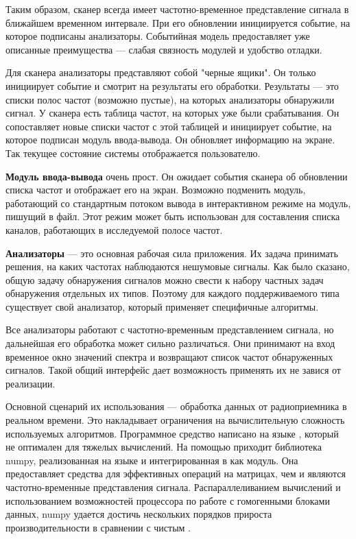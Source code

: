 Таким образом, сканер всегда имеет частотно-временное представление сигнала в ближайшем временном интервале. При его обновлении инициируется событие, на которое подписаны анализаторы. Событийная модель предоставляет уже описанные преимущества --- слабая связность модулей и удобство отладки.

Для сканера анализаторы представляют собой "черные ящики". Он только инициирует событие и смотрит на результаты его обработки. Результаты --- это списки полос частот (возможно пустые), на которых анализаторы обнаружили сигнал. У сканера есть таблица частот, на которых уже были срабатывания. Он сопоставляет новые списки частот с этой таблицей и инициирует событие, на которое подписан модуль ввода-вывода. Он обновляет информацию на экране. Так текущее состояние системы отображается пользователю.

\textbf{Модуль ввода-вывода} очень прост. Он ожидает события сканера об обновлении списка частот и отображает его на экран. Возможно подменить модуль, работающий со стандартным потоком вывода в интерактивном режиме на модуль, пишущий в файл. Этот режим может быть использован для составления списка каналов, работающих в исследуемой полосе частот.

\textbf{Анализаторы} --- это основная рабочая сила приложения. Их задача принимать решения, на каких частотах наблюдаются нешумовые сигналы. Как было сказано, общую задачу обнаружения сигналов можно свести к набору частных задач обнаружения отдельных их типов. Поэтому для каждого поддерживаемого типа существует свой анализатор, который применяет специфичные алгоритмы.

Все анализаторы работают с частотно-временным представлением сигнала, но дальнейшая его обработка может сильно различаться. Они принимают на вход временное окно значений спектра и возвращают список частот обнаруженных сигналов. Такой общий интерфейс дает возможность применять их не завися от реализации.

Основной сценарий их использования --- обработка данных от радиоприемника в реальном времени. Это накладывает ограничения на вычислительную сложность используемых алгоритмов. Программное средство написано на языке \python, который не оптимален для тяжелых вычислений. На помощью приходит библиотека numpy, реализованная на языке \purec и интегрированная в \python как модуль. Она предоставляет средства для эффективных операций на матрицах, чем и являются частотно-временные представления сигнала. Распараллеливанием вычислений и использованием возможностей процессора по работе с гомогенными блоками данных, numpy удается достичь нескольких порядков прироста производительности в сравнении с чистым \python.

